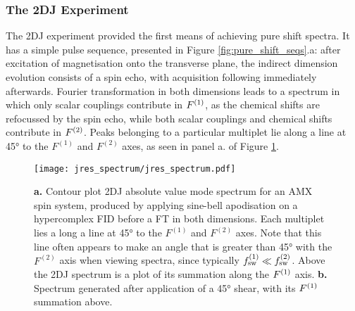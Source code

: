 \subsubsection{The \acl{2DJ} Experiment}
The \ac{2DJ} experiment\cite{Aue1976, Morris2009} provided the first means of
achieving pure shift spectra.  It has a simple pulse sequence, presented in
Figure \ref{fig:pure_shift_seqs}.a: after excitation of magnetisation onto the
transverse plane, the indirect dimension evolution consists of a spin echo, with
acquisition following immediately afterwards. Fourier transformation in both
dimensions leads to a spectrum in which only scalar couplings contribute in
$F^{(1)}$, as the chemical shifts are refocussed by the spin echo, while both
scalar couplings and chemical shifts contribute in $F^{(2)}$.
Peaks belonging to a particular multiplet lie along a line at \ang{45} to the
$F^{(1)}$ and $F^{(2)}$ axes, as seen in panel a. of Figure
\ref{fig:jres_spectrum}.
\begin{figure}%
    \centering%
    \texttt{[image: jres\_spectrum/jres\_spectrum.pdf]}%
    \caption{%
        \textbf{a.} Contour plot \ac{2DJ} absolute value mode spectrum for an
        AMX spin system, produced by applying sine-bell apodisation on a hypercomplex
        \ac{FID} before a \ac{FT} in both dimensions. Each multiplet lies a
        long a line at \ang{45} to the $F^{(1)}$ and $F^{(2)}$ axes. Note that
        this line often appears to make an angle that is greater than \ang{45}
        with the $F^{(2)}$ axis when viewing spectra, since typically $f_{\mathrm{sw}}^{(1)}
        \ll f_{\mathrm{sw}}^{(2)}$. Above the \ac{2DJ} spectrum is a plot of its summation
        along the $F^{(1)}$ axis.
        \textbf{b.} Spectrum generated after application of a \ang{45} shear,
        with its $F^{(1)}$ summation above.
   }%
    \label{fig:jres_spectrum}%
\end{figure}%

